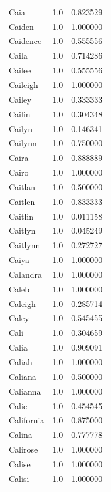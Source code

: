 \documentclass[
  letterpaper,
  DIV=11,
  numbers=noendperiod]{scrreprt}
\begin{document}
\begin{tabular}{lrr}
Caia            &   1.0 &   0.823529 \\
Caiden          &   1.0 &   1.000000 \\
Caidence        &   1.0 &   0.555556 \\
Caila           &   1.0 &   0.714286 \\
Cailee          &   1.0 &   0.555556 \\
Caileigh        &   1.0 &   1.000000 \\
Cailey          &   1.0 &   0.333333 \\
Cailin          &   1.0 &   0.304348 \\
Cailyn          &   1.0 &   0.146341 \\
Cailynn         &   1.0 &   0.750000 \\
Caira           &   1.0 &   0.888889 \\
Cairo           &   1.0 &   1.000000 \\
Caitlan         &   1.0 &   0.500000 \\
Caitlen         &   1.0 &   0.833333 \\
Caitlin         &   1.0 &   0.011158 \\
Caitlyn         &   1.0 &   0.045249 \\
Caitlynn        &   1.0 &   0.272727 \\
Caiya           &   1.0 &   1.000000 \\
Calandra        &   1.0 &   1.000000 \\
Caleb           &   1.0 &   1.000000 \\
Caleigh         &   1.0 &   0.285714 \\
Caley           &   1.0 &   0.545455 \\
Cali            &   1.0 &   0.304659 \\
Calia           &   1.0 &   0.909091 \\
Caliah          &   1.0 &   1.000000 \\
Caliana         &   1.0 &   0.500000 \\
Calianna        &   1.0 &   1.000000 \\
Calie           &   1.0 &   0.454545 \\
California      &   1.0 &   0.875000 \\
Calina          &   1.0 &   0.777778 \\
Calirose        &   1.0 &   1.000000 \\
Calise          &   1.0 &   1.000000 \\
Calisi          &   1.0 &   1.000000 \\

\end{tabular}
\end{document}
